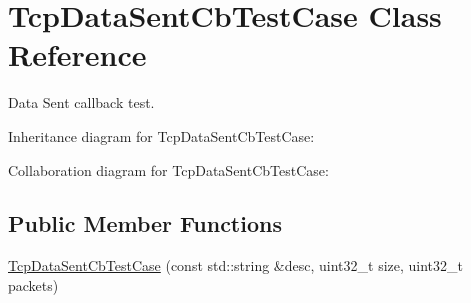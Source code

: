 \hypertarget{classTcpDataSentCbTestCase}{}\section{Tcp\+Data\+Sent\+Cb\+Test\+Case Class Reference}
\label{classTcpDataSentCbTestCase}


Data Sent callback test.  




Inheritance diagram for Tcp\+Data\+Sent\+Cb\+Test\+Case\+:


Collaboration diagram for Tcp\+Data\+Sent\+Cb\+Test\+Case\+:
\subsection*{Public Member Functions}
\begin{DoxyCompactItemize}
\item 
\hyperlink{classTcpDataSentCbTestCase_a885b0dc1f570577b0f7838d15b0beaeb}{Tcp\+Data\+Sent\+Cb\+Test\+Case} (const std\+::string \&desc, uint32\+\_\+t size, uint32\+\_\+t packets)
\end{DoxyCompactItemize}
